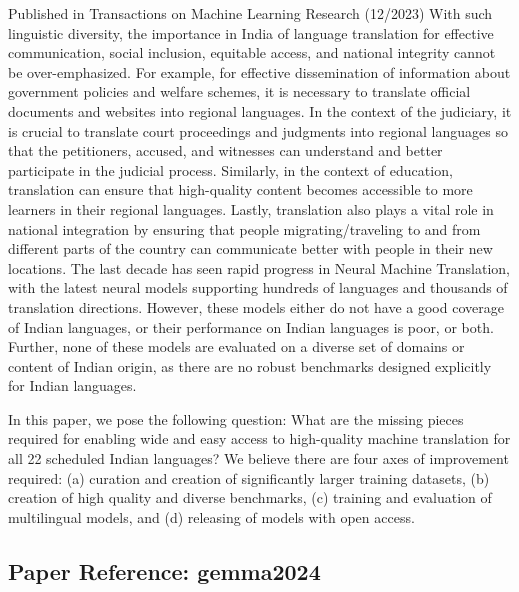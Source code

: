 \documentclass[11pt,a4paper]{article}
\begin{document}
Published in Transactions on Machine Learning Research (12/2023) With such linguistic diversity, the importance in India of language translation for effective communication, social inclusion, equitable access, and national integrity cannot be over-emphasized. For example, for effective dissemination of information about government policies and welfare schemes, it is necessary to translate official documents and websites into regional languages. In the context of the judiciary, it is crucial to translate court proceedings and judgments into regional languages so that the petitioners, accused, and witnesses can understand and better participate in the judicial process. Similarly, in the context of education, translation can ensure that high-quality content becomes accessible to more learners in their regional languages. Lastly, translation also plays a vital role in national integration by ensuring that people migrating/traveling to and from different parts of the country can communicate better with people in their new locations. The last decade has seen rapid progress in Neural Machine Translation, with the latest neural models supporting hundreds of languages and thousands of translation directions. However, these models either do not have a good coverage of Indian languages, or their performance on Indian languages is poor, or both. Further, none of these models are evaluated on a diverse set of domains or content of Indian origin, as there are no robust benchmarks designed explicitly for Indian languages.

In this paper, we pose the following question: What are the missing pieces required for enabling wide and easy access to high-quality machine translation for all 22 scheduled Indian languages? We believe there are four axes of improvement required: (a) curation and creation of significantly larger training datasets, (b) creation of high quality and diverse benchmarks, (c) training and evaluation of multilingual models, and (d) releasing of models with open access.

\vspace{18pt}


\subsection*{Paper Reference: gemma2024}
\end{document}
